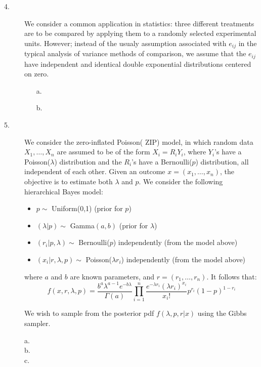 \documentclass[12pt]{article}
\begin{document}
\begin{description}

\item[4.] We consider a common application in statistics: three different treatments are to be compared by applying them to a randomly selected experimental units. However; instead of the usualy assumption associated with $e_{ij}$ in the typical analysis of variance methods of comparison, we assume that the $e_{ij}$  have independent and identical double exponential distributions centered on zero.
\begin{itemize}
\item[a.]
\item[b.]
\end{itemize}



\item[5.] We consider the zero-inflated Poisson( ZIP) model, in which random data $X_1, \dots, X_n$ are assumed to be of the form $X_i = R_iY_i$, where $Y_i$'s have a Poisson($\lambda$) distribution and the $R_i$'s have a Bernoulli($p$) distribution, all independent of each other. Given an outcome $x = (x_1, \dots, x_n)$, the objective is to estimate both $\lambda$ and $p$. We consider the following hierarchical Bayes model:
\begin{itemize}
\item $p \sim$ Uniform(0,1) (prior for $p$)
\item $(\lambda | p) \sim$ Gamma$(a, b)$ (prior for $\lambda$)
\item $(r_i | p, \lambda) \sim$ Bernoulli($p$) independently (from the model above)
\item $(x_i | r, \lambda, p) \sim$ Poisson($\lambda r_i$) independently (from the model above)
\end{itemize}
where $a$ and $b$ are known parameters, and $r = (r_1, \dots, r_n)$. It follows that:
\[f(x, r, \lambda, p) = \frac{b^a\lambda^{a-1}e^{-b\lambda}}{\Gamma(a)}\prod^n_{i = 1} \frac{e^{-\lambda r_i} (\lambda r_i)^{x_i}}{x_i!} p^{r_i} (1 - p)^{1 - r_i}\]

We wish to sample from the posterior pdf $f(\lambda, p, r | x)$ using the Gibbs sampler.\
\begin{description}
\item[a.]
\item[b.]
\item[c.]
\end{description}



\end{description}
\end{document}
